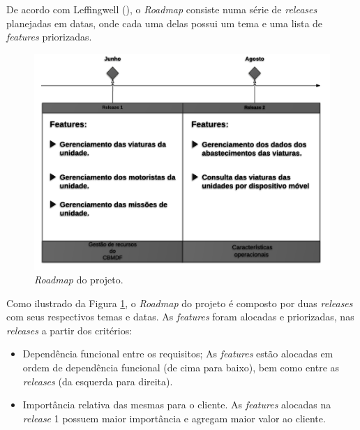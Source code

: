 
  De acordo com Leffingwell (\citeyear{leffingwell11}), o \textit{Roadmap} consiste numa série de \textit{releases} planejadas em datas, onde cada
  uma delas possui um tema e uma lista de \textit{features} priorizadas.
  
   \begin{figure}[!htbp]
    \centering
    \includegraphics[scale=0.4, angle=0]{figuras/roadmap}
    \caption[\textit{Roadmap} do projeto.]{\textit{Roadmap} do projeto.}
    \label{fig:roadmap}
  \end{figure}
  
  Como ilustrado da Figura \ref{fig:roadmap}, o \textit{Roadmap} do projeto é composto por duas \textit{releases} com seus
  respectivos temas e datas. As \textit{features} foram alocadas e priorizadas, nas \textit{releases} a partir dos critérios: 
  
  \begin{itemize}
   \item Dependência funcional entre os requisitos;
    \subitem As \textit{features} estão alocadas em ordem de dependência funcional (de cima para baixo), bem como entre as
    \textit{releases} (da esquerda para direita).
    
   \item Importância relativa das mesmas para o cliente.
    \subitem As \textit{features} alocadas na \textit{release} 1 possuem maior importância e agregam maior valor ao cliente.
  \end{itemize}
